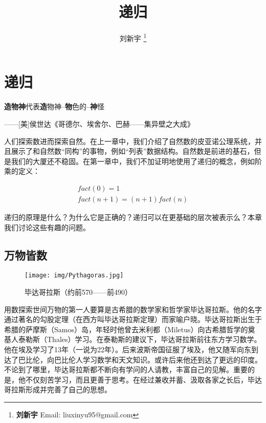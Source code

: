 \documentclass[b5paper]{ctexart}
\begin{document}
\title{递归}

\author{刘新宇
\thanks{{\bfseries 刘新宇} \newline
  Email: liuxinyu95@gmail.com \newline}
  }

\maketitle
\fi


\ifx\wholebook\relax
\chapter{递归}
\fi

\epigraph{\textbf{造物神}代表\textbf{造}物神--\textbf{物}色的--\textbf{神}怪}{——[美]侯世达《哥德尔、埃舍尔、巴赫——集异壁之大成》}

人们探索数进而探索自然。在上一章中，我们介绍了自然数的皮亚诺公理系统，并且展示了和自然数“同构”的事物，例如“列表”数据结构。自然数是前进的基石，但是我们的大厦还不稳固。在第一章中，我们不加证明地使用了递归的概念，例如阶乘的定义：

\[
\begin{array}{l}
\textit{fact}(0) = 1 \\
\textit{fact}(n + 1) = (n + 1) \textit{fact}(n)
\end{array}
\]

递归的原理是什么？为什么它是正确的？递归可以在更基础的层次被表示么？本章我们讨论这些有趣的问题。

\section{万物皆数}

\begin{figure}[htbp]
 \centering
 \texttt{[image: img/Pythagoras.jpg]}
 \caption{毕达哥拉斯（约前570——前490）}
 \label{fig:Pythagoras}
\end{figure}

用数探索世间万物的第一人要算是古希腊的数学家和哲学家毕达哥拉斯。他的名字通过著名的勾股定理（在西方叫毕达哥拉斯定理）而家喻户晓。毕达哥拉斯出生于希腊的萨摩斯（Samos）岛，年轻时他曾去米利都（Miletus）向古希腊哲学的奠基人泰勒斯（Thales）学习。在泰勒斯的建议下，毕达哥拉斯前往东方学习数学。他在埃及学习了13年（一说为22年）。后来波斯帝国征服了埃及，他又随军向东到达了巴比伦，向巴比伦人学习数学和天文知识。或许后来他还到达了更远的印度。不论到了哪里，毕达哥拉斯都不断向有学问的人请教，丰富自己的见解。重要的是，他不仅刻苦学习，而且更善于思考。在经过兼收并蓄、汲取各家之长后，毕达哥拉斯形成并完善了自己的思想\cite{HanXueTao16}。
\end{document}
